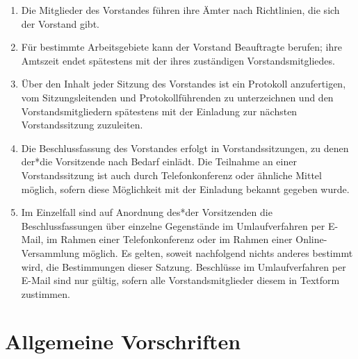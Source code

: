 \documentclass[%
12pt, %
a4paper, %
headsepline, %
parskip, %
headings=normal, %
]{scrreprt}
\begin{document}
\begin{enumerate}
    \item Die Mitglieder des Vorstandes führen ihre Ämter nach Richtlinien, die sich der Vorstand gibt.
    \item Für bestimmte Arbeitsgebiete kann der Vorstand Beauftragte berufen; ihre Amtszeit endet spätestens mit der ihres zuständigen Vorstandsmitgliedes.
    \item Über den Inhalt jeder Sitzung des Vorstandes ist ein Protokoll anzufertigen, vom Sitzungsleitenden und Protokollführenden zu unterzeichnen und den Vorstandsmitgliedern spätestens mit der Einladung zur nächsten Vorstandssitzung zuzuleiten.
    \item Die Beschlussfassung des Vorstandes erfolgt in Vorstandssitzungen, zu denen der*die Vorsitzende nach Bedarf einlädt. Die Teilnahme an einer Vorstandssitzung ist auch durch Telefonkonferenz oder ähnliche Mittel möglich, sofern diese Möglichkeit mit der Einladung bekannt gegeben wurde.
    \item Im Einzelfall sind auf Anordnung des*der Vorsitzenden die Beschlussfassungen über einzelne Gegenstände im Umlaufverfahren per E-Mail, im Rahmen einer Telefonkonferenz oder im Rahmen einer Online-Versammlung möglich. Es gelten, soweit nachfolgend nichts anderes bestimmt wird, die Bestimmungen dieser Satzung. Beschlüsse im Umlaufverfahren per E-Mail sind nur gültig, sofern alle Vorstandsmitglieder diesem in Textform zustimmen.
\end{enumerate}

\chapter{Allgemeine Vorschriften}
\setcounter{section}{7}
\end{document}
